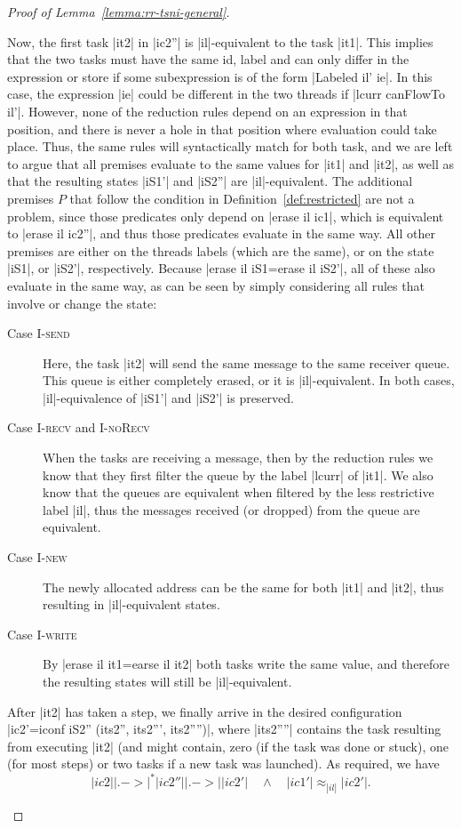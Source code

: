 \begin{proof}[Proof of Lemma~\ref{lemma:rr-tsni-general}]
\begin{itemize}
    Now, the first task |it2| in |ic2''| is |il|-equivalent to the task |it1|.
    This implies that the two tasks must have the same id, label and
    can only differ in the expression or store if some subexpression
    is of the form |Labeled il' ie|.  In this case, the expression |ie| could
    be different in the two threads if |lcurr canFlowTo il'|.  However, none of the reduction rules
    depend on an expression in that position, and there is never a
    hole in that position
    where evaluation could take place.  Thus, the same rules will syntactically
    match for both task, and we are left to argue that all premises
    evaluate to the same values for |it1| and |it2|, as well as that
    the resulting states |iS1'| and
    |iS2''| are |il|-equivalent.
    The additional premises $P$ that follow
    the condition in Definition~\ref{def:restricted} are not a problem,
    since those
    predicates only depend on |erase il ic1|, which is equivalent
    to |erase il ic2''|, and thus those predicates evaluate in the same way.
    All other premises are either on the threads labels (which are the same),
    or on the state |iS1|, or |iS2'|, respectively.  Because
    |erase il iS1=erase il iS2'|, all of these also evaluate in the same way,
    as can be seen by simply considering all rules that involve or
    change the state:
    \begin{description}
      \item[Case \textsc{I-send}]
      Here, the task |it2| will send the same message to the same
      receiver queue. This
      queue is either completely erased, or it is |il|-equivalent.  In both
      cases, |il|-equivalence of |iS1'| and |iS2'| is preserved.
      \item[Case \textsc{I-recv} and \textsc{I-noRecv}]
      When the tasks are receiving a message, then by the reduction rules
      we know that they first filter the queue by the label
      |lcurr| of |it1|.  We
      also know that the queues are equivalent when filtered by the less
      restrictive label |il|, thus the messages received (or dropped) from the
      queue are equivalent.
      \item[Case \textsc{I-new}] The newly allocated address can be the same
      for both |it1| and |it2|, thus resulting in |il|-equivalent states.
      \item[Case \textsc{I-write}] By |erase il it1=earse il it2| both tasks
      write the same value, and therefore the resulting states will still
      be |il|-equivalent.
    \end{description}
    After |it2| has taken a step, we finally arrive in the desired
    configuration |ic2'=iconf iS2'' (its2'', its2''', its2'''')|, where
    |its2''''| contains the task resulting from executing |it2| (and
    might contain, zero (if the task was done or stuck), one (for most steps) or two tasks if a new task was launched).
    As required, we have
    \[ |ic2| |.->|^* |ic2''| |.->| |ic2'|
    \quad \land \quad |ic1'| \approx_{|il|} |ic2'| \text{.}\]
  \end{itemize}
\end{proof}
